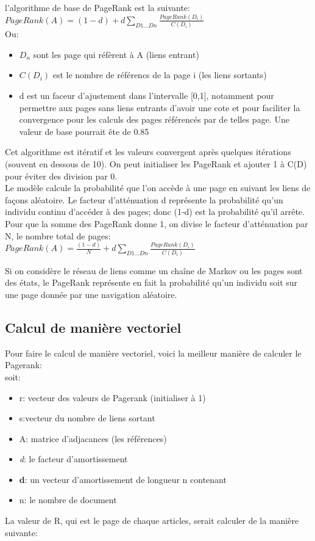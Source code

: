 \documentclass[oneside]{book}
\begin{document}
l'algorithme de base de PageRank est la suivante:\\

\centering
$PageRank(A) = (1-d) + d \sum\limits_{D1...Dn} \frac{PageRank(D_i)}{C(D_i)}$\\
\justify
Ou:
\begin{itemize}
\item $D_n$ sont les page qui réfèrent à A (liens entrant)
\item $C(D_i)$ est le nombre de référencs de la page i (les liens sortants)
\item d est un faceur d'ajustement dans l'intervalle [0,1], notamment pour permettre aux pages sans liens entrants d'avoir une cote et pour faciliter la convergence pour les calculs des pages référencés par de telles page. Une valeur de base pourrait ête de 0.85
\end{itemize}
Cet algorithme est itératif et les valeurs convergent après quelques itérations (souvent en dessous de 10). On peut initialiser les PageRank et ajouter 1 à C(D) pour éviter des division par 0.\\

Le modèle calcule la probabilité que l'on accède à une page en suivant les liens de façons aléatoire. Le facteur d'atténuation d représente la probabilité qu'un individu continu d'accéder à des pages; donc (1-d) est la probabilité qu'il arrête. \\

Pour que la somme des PageRank donne 1, on divise le facteur d'atténuation par N, le nombre total de pages:\\

\centering
$PageRank(A) = \frac{(1-d)}{N} + d \sum\limits_{D1...Dn} \frac{PageRank(D_i)}{C(D_i)}$\\
\justify

Si on considère le réseau de liens comme un chaîne de Markov ou les pages sont des états, le PageRank représente en fait la probabilité qu'un individu soit sur une page donnée par une navigation aléatoire. 

\subsection{Calcul de manière vectoriel}
Pour faire le calcul de manière vectoriel, voici la meilleur manière de calculer le Pagerank:\\

soit:
\begin{itemize}
\item r: vecteur des valeurs de Pagerank (initialiser à 1)
\item s:vecteur du nombre de liens sortant
\item A: matrice d'adjacances (les références)
\item \textit{d}: le facteur d'amortissement
\item \textbf{d}: un vecteur d'amortissement de longueur n contenant
\item n: le nombre de document
\end{itemize}
La valeur de R, qui est le page de chaque articles, serait calculer de la manière suivante:\\
\end{document}
